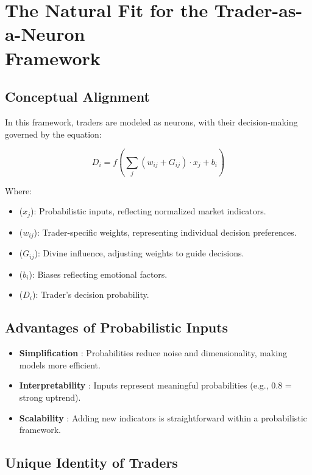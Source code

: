 \documentclass[a4]{article}
\begin{document}
\section{The Natural Fit for the Trader-as-a-Neuron \\ Framework}

\subsection{Conceptual Alignment}

In this framework, traders are modeled as neurons, with their decision-making governed by the equation:

$$
D_i = f\left(\sum_{j} (w_{ij} + G_{ij}) \cdot x_j + b_i\right)
$$

Where:

\begin{itemize}
\item  ($x_j$): Probabilistic inputs, reflecting normalized market indicators.
\item ($w_{ij}$): Trader-specific weights, representing individual decision preferences.
\item ($G_{ij}$): Divine influence, adjusting weights to guide decisions.
\item   ($b_i$): Biases reflecting emotional factors.
\item ($D_i$): Trader's decision probability.
\end{itemize}

\subsection{Advantages of Probabilistic Inputs}

\begin{itemize}
\item  {\bf Simplification} : Probabilities reduce noise and dimensionality, making models more efficient.
\item {\bf Interpretability} : Inputs represent meaningful probabilities (e.g., 0.8 = strong uptrend).
\item  {\bf Scalability} : Adding new indicators is straightforward within a probabilistic framework.
\end{itemize}

\subsection{Unique Identity of Traders}
\end{document}
